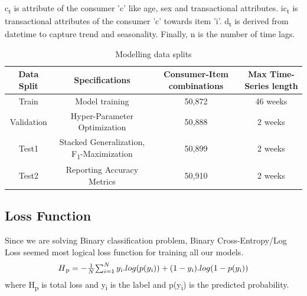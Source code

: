 c\textsubscript{t} is attribute of the consumer 'c' like age, sex and transactional attributes. 
ic\textsubscript{t} is transactional attributes of the consumer 'c'  towards item 'i'. 
d\textsubscript{t} is derived from datetime to capture trend and seasonality. 
Finally, n is the number of time lags.
\begin{table}[t]
\caption{Modelling data splits}
\vspace{0.1 in}
\centering
\resizebox{3.3in}{!}
{%
\begin{tabular}{|c|c|c|c|}
\hline
{\bf Data Split} & {\bf Specifications} & {\bf Consumer-Item combinations} & {\bf Max Time-Series length} \\  
\hline\hline
Train  		&  Model training &  50,872 &  46 weeks \\ \hline
Validation	  		&  Hyper-Parameter Optimization &  50,888 &  2 weeks \\ \hline
Test1  		&  Stacked Generalization, F\textsubscript{1}-Maximization & 50,899 &  2 weeks\\ \hline
Test2	  		&  Reporting Accuracy Metrics & 50,910 &  2 weeks\\
\hline
\end{tabular}
}
\label{tab:mlmodels}
\end{table}
\subsection{Loss Function}
Since we are solving Binary classification problem, Binary Cross-Entropy/Log Loss seemed most logical loss function 
for training all our models.
  \begin{equation}
      \begin{array}{l}
        H\textsubscript{p} = - \frac{1}{N}$$\sum_{i=1}^{N}y\textsubscript{i}.log(p(y\textsubscript{i}))+
        (1- y\textsubscript{i}).log(1-p(y\textsubscript{i}))
      \end{array}
    \label{eqn:logloss}
  \end{equation}
where H\textsubscript{p} is total loss and y\textsubscript{i} is the label and p(y\textsubscript{i}) is the predicted probability.
